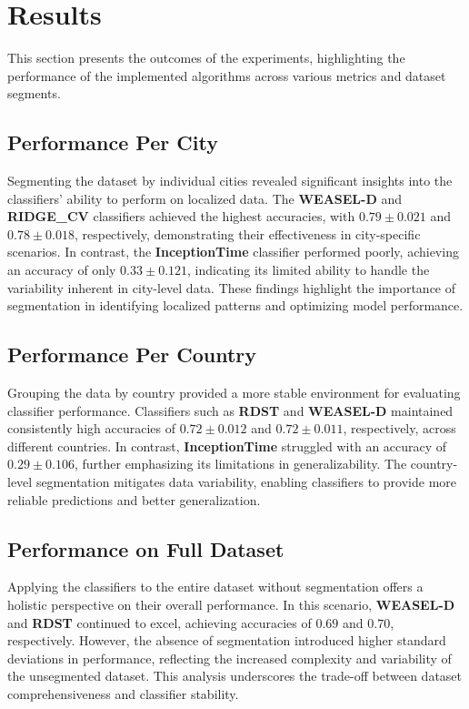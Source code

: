 \documentclass{ieeeaccess}
\begin{document}


\section{Results}
\label{sec:results}

This section presents the outcomes of the experiments, highlighting the performance of the implemented algorithms across various metrics and dataset segments.

\subsection{Performance Per City}
Segmenting the dataset by individual cities revealed significant insights into the classifiers' ability to perform on localized data. The \textbf{WEASEL-D} and \textbf{RIDGE\_CV} classifiers achieved the highest accuracies, with \(0.79 \pm 0.021\) and \(0.78 \pm 0.018\), respectively, demonstrating their effectiveness in city-specific scenarios. In contrast, the \textbf{InceptionTime} classifier performed poorly, achieving an accuracy of only \(0.33 \pm 0.121\), indicating its limited ability to handle the variability inherent in city-level data. These findings highlight the importance of segmentation in identifying localized patterns and optimizing model performance.

\subsection{Performance Per Country}
Grouping the data by country provided a more stable environment for evaluating classifier performance. Classifiers such as \textbf{RDST} and \textbf{WEASEL-D} maintained consistently high accuracies of \(0.72 \pm 0.012\) and \(0.72 \pm 0.011\), respectively, across different countries. In contrast, \textbf{InceptionTime} struggled with an accuracy of \(0.29 \pm 0.106\), further emphasizing its limitations in generalizability. The country-level segmentation mitigates data variability, enabling classifiers to provide more reliable predictions and better generalization.

\subsection{Performance on Full Dataset}
Applying the classifiers to the entire dataset without segmentation offers a holistic perspective on their overall performance. In this scenario, \textbf{WEASEL-D} and \textbf{RDST} continued to excel, achieving accuracies of \(0.69\) and \(0.70\), respectively. However, the absence of segmentation introduced higher standard deviations in performance, reflecting the increased complexity and variability of the unsegmented dataset. This analysis underscores the trade-off between dataset comprehensiveness and classifier stability.
\end{document}
